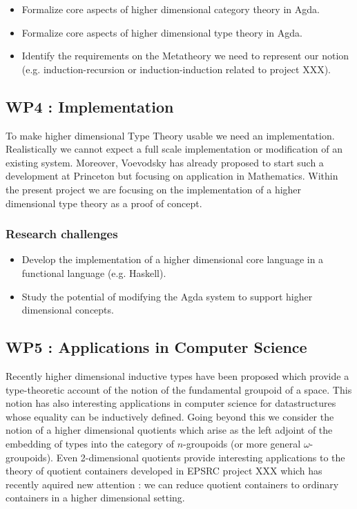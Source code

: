 \documentclass[twocolumn,a4paper,11pt]{article}
\begin{document}
{\begin{itemize}
\item Formalize core aspects of higher dimensional category theory in
  Agda.

\item Formalize core aspects of higher dimensional type theory in Agda.

\item Identify the requirements on the Metatheory we need to represent
  our notion (e.g. induction-recursion or induction-induction related
  to project XXX).

\end{itemize}

\subsection*{WP4 : Implementation} 

To make higher dimensional Type Theory usable we need an
implementation. Realistically we cannot expect a full scale
implementation or modification of an existing system. Moreover,
Voevodsky has already proposed to start such a development at
Princeton but focusing on application in Mathematics. Within the
present project we are focusing on the implementation of a higher
dimensional type theory as a proof of concept. 

\subsubsection*{Research challenges}

\begin{itemize}
\item Develop the implementation of a higher dimensional core language
  in a functional language (e.g. Haskell).

\item Study the potential of modifying the Agda system to support
  higher dimensional concepts.
  
\end{itemize}


\subsection*{WP5 : Applications in Computer Science} 
Recently higher dimensional inductive types have been proposed
\cite{shulman:blog} which provide a type-theoretic account of the
notion of the fundamental groupoid of a space. This notion has also
interesting applications in computer science for datastructures whose
equality can be inductively defined. Going beyond this we consider the
notion of a higher dimensional quotients which arise as the left
adjoint of the embedding of types into the category of $n$-groupoids
(or more general $\omega$-groupoids). Even 2-dimensional quotients
provide interesting applications to the theory of quotient containers
\cite{abottAltenGhaniMcB:quotientContainers} developed in EPSRC
project XXX which has recently aquired new attention
\cite{gylterud:thesis,kock:groupoids}: we can reduce quotient containers to ordinary
containers in a higher dimensional setting.

}
\end{document}
